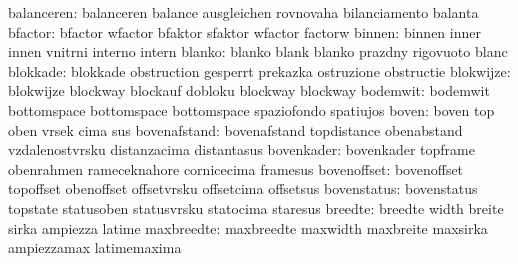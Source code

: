                balanceren: balanceren                balance
                           ausgleichen               rovnovaha
                           bilanciamento             balanta
                  bfactor: bfactor                   wfactor
                           bfaktor                   sfaktor
                           wfactor                   factorw %
                   binnen: binnen                    inner
                           innen                     vnitrni
                           interno                   intern
                   blanko: blanko                    blank
                           blanko                    prazdny
                           rigovuoto                 blanc
                 blokkade: blokkade                  obstruction
                           gesperrt                  prekazka
                           ostruzione                obstructie
                blokwijze: blokwijze                 blockway
                           blockauf                  dobloku
                           blockway                  blockway %
                 bodemwit: bodemwit                  bottomspace
                           bottomspace               bottomspace
                           spaziofondo               spatiujos
                    boven: boven                     top
                           oben                      vrsek
                           cima                      sus
             bovenafstand: bovenafstand              topdistance
                           obenabstand               vzdalenostvrsku
                           distanzacima              distantasus
               bovenkader: bovenkader                topframe
                           obenrahmen                rameceknahore
                           cornicecima               framesus
              bovenoffset: bovenoffset               topoffset
                           obenoffset                offsetvrsku
                           offsetcima                offsetsus
              bovenstatus: bovenstatus               topstate
                           statusoben                statusvrsku
                           statocima                 staresus
                  breedte: breedte                   width
                           breite                    sirka
                           ampiezza                  latime
               maxbreedte: maxbreedte                maxwidth
                           maxbreite                 maxsirka
                           ampiezzamax               latimemaxima
